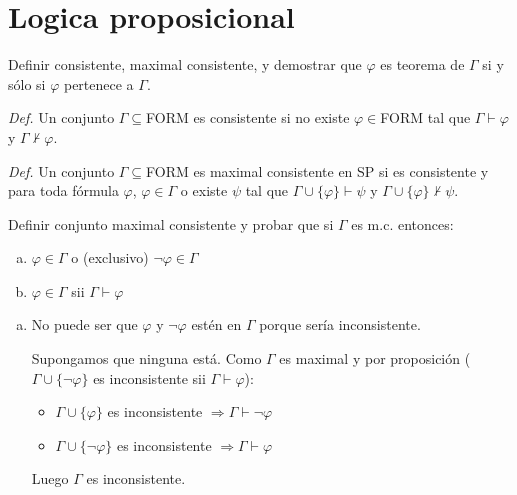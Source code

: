 \section{Logica proposicional}

\begin{questions}

\question Definir consistente, maximal consistente, y demostrar que $\varphi$ es teorema de $\Gamma$ si y s\'olo si $\varphi$ pertenece a $\Gamma$. 

\begin{solution}

 {\it Def. } Un conjunto $\Gamma\subseteq$FORM es consistente si no existe $\varphi\in$FORM tal que $\Gamma\vdash\varphi$ y $\Gamma\nvdash\varphi$.
 
 {\it Def. } Un conjunto $\Gamma\subseteq$FORM es maximal consistente en SP si es consistente y para toda f\'ormula $\varphi$, $\varphi\in\Gamma$ o existe $\psi$ tal que $\Gamma\cup\{\varphi\}\vdash\psi$ y $\Gamma\cup\{\varphi\}\nvdash\psi$.
\end{solution}

\question Definir conjunto maximal consistente y probar que si $\Gamma$ es m.c. entonces: 

\begin{enumerate}[a)]
 \item $\varphi\in\Gamma$ o (exclusivo) $\neg\varphi\in\Gamma$
 \item $\varphi\in\Gamma$ sii $\Gamma\vdash\varphi$
\end{enumerate}

\begin{solution}
 \begin{enumerate}[a)]
  \item No puede ser que $\varphi$ y $\neg\varphi$ est\'en en $\Gamma$ porque ser\'ia inconsistente.
  
  Supongamos que ninguna est\'a. Como $\Gamma$ es maximal y por proposici\'on ($\Gamma\cup\{\neg\varphi\}$ es inconsistente sii $\Gamma\vdash\varphi$): 
  
  \begin{itemize}
   \item $\Gamma\cup\{\varphi\}$ es inconsistente $\Rightarrow \Gamma\vdash\neg\varphi$
   \item $\Gamma\cup\{\neg\varphi\}$ es inconsistente $\Rightarrow \Gamma\vdash\varphi$
  \end{itemize}

  Luego $\Gamma$ es inconsistente. 
 \end{enumerate}


\end{solution}
\end{questions}
